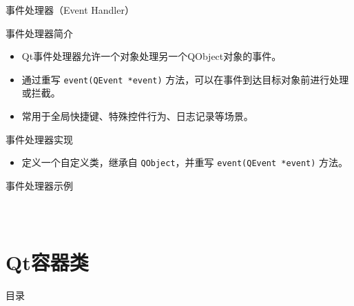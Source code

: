 \documentclass[UTF8,aspectratio=169]{beamer}
\begin{document}
\begin{frame}[fragile]{事件处理器（Event Handler）}
    \begin{ytublock}{事件处理器简介}
        \begin{itemize}
            \item Qt事件处理器允许一个对象处理另一个QObject对象的事件。
            \item 通过重写 \texttt{event(QEvent *event)} 方法，可以在事件到达目标对象前进行处理或拦截。
            \item 常用于全局快捷键、特殊控件行为、日志记录等场景。
        \end{itemize}
    \end{ytublock}
    \begin{ytublock}{事件处理器实现}
        \begin{itemize}
            \item 定义一个自定义类，继承自 \texttt{QObject}，并重写 \texttt{event(QEvent *event)} 方法。
        \end{itemize}
    \end{ytublock}
\end{frame}

\begin{frame}[fragile]{事件处理器示例}
    \begin{columns}
        \begin{column}{0.48\textwidth}
            \inputminted[firstline=1,lastline=14]{cpp}{code/qt_event_handler_example.cpp}
        \end{column}
        \begin{column}{0.48\textwidth}
            \inputminted[firstline=15,lastline=27]{cpp}{code/qt_event_handler_example.cpp}
        \end{column}
    \end{columns}
\end{frame}

\section{Qt容器类}
\begin{frame}{目录}
    \begin{multicols}{2}
        \tableofcontents[currentsection]
    \end{multicols}
\end{frame}
\end{document}
